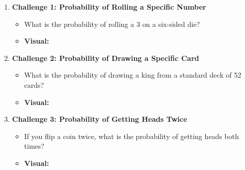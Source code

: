 \begin{enumerate}
    \item \textbf{Challenge 1: Probability of Rolling a Specific Number}
    \begin{itemize}
        \item What is the probability of rolling a 3 on a six-sided die?
        \item \textbf{Visual:}
        \begin{center}
        \end{center}
    \end{itemize}

    \item \textbf{Challenge 2: Probability of Drawing a Specific Card}
    \begin{itemize}
        \item What is the probability of drawing a king from a standard deck of 52 cards?
        \item \textbf{Visual:}
        \begin{center}
        \end{center}
    \end{itemize}

    \item \textbf{Challenge 3: Probability of Getting Heads Twice}
    \begin{itemize}
        \item If you flip a coin twice, what is the probability of getting heads both times?
        \item \textbf{Visual:}
        \begin{center}
        \end{center}
    \end{itemize}


\end{enumerate}
